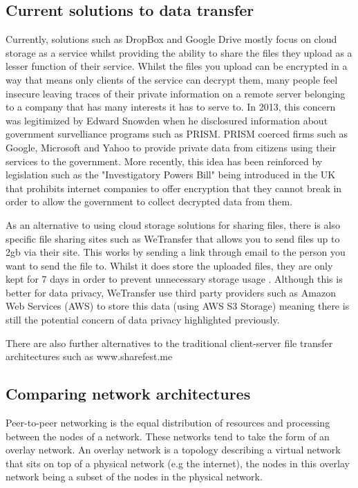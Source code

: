 \documentclass[]{report}
\begin{document}
		\subsection*{Current solutions to data transfer}
			Currently, solutions such as DropBox and Google Drive mostly focus on cloud storage as a service whilst providing the ability to share the files they upload as a lesser function of their service. Whilst the files you upload can be encrypted in a way that means only clients of the service can decrypt them, many people feel insecure leaving traces of their private information on a remote server belonging to a company that has many interests it has to serve to. In 2013, this concern was legitimized by Edward Snowden when he disclosured information about government survelliance programs such as PRISM. PRISM coerced firms such as Google, Microsoft and Yahoo to provide private data from citizens using their services to the government. \cite{PRISM}  More recently, this idea has been reinforced by legislation such as the "Investigatory Powers Bill"  being introduced in the UK that prohibits internet companies to offer encryption that they cannot break in order to allow the government to collect decrypted data from them. 
			
			As an alternative to using cloud storage solutions for sharing files, there is also specific file sharing sites such as WeTransfer that allows you to send files up to 2gb via their site. This works by sending a link through email to the person you want to send the file to. Whilst it does store the uploaded files, they are only kept for 7 days in order to prevent unnecessary storage usage \cite{WeTransfer Storage Time}. Although this is better for data privacy, WeTransfer use third party providers such as Amazon Web Services (AWS) to store this data (using AWS S3 Storage) \cite{WeTransfer AWS Case Study} meaning there is still the potential concern of data privacy highlighted previously.
			
			There are also further alternatives to the traditional client-server file transfer architectures such as www.sharefest.me
			
		\subsection*{Comparing network architectures}	
			Peer-to-peer networking is the equal distribution of resources and processing between the nodes of a network. These networks tend to take the form of an overlay network. An overlay network is a topology describing a virtual network that sits on top of a physical network (e.g the internet), the nodes in this overlay network being a subset of the nodes in the physical network. 
			
\end{document}

